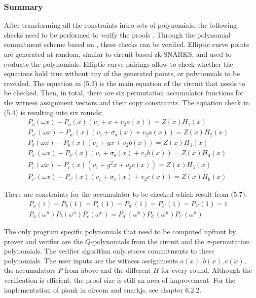 \subsubsection{Summary}
After transforming all the constraints intro sets of polynomials, the following checks need to be performed to verify the proofs \citep{PLONKcryptoeprint:2019/953, buterinplonk, chen2022review}. Through the polynomial commitment scheme based on \citep{Kate2010ConstantSizeCT}, these checks can be verified. Elliptic curve points are generated at random, similar to circuit based zk-SNARKS, and used to evaluate the polynomials. Elliptic curve pairings allow to check whether the equations hold true without any of the generated points, or polynomials to be revealed. 
The equation in (5.3) is the main equation of the circuit that needs to be checked. Then, in total, there are six permutation accumulator functions for the witness assignment vectors and their copy constraints. The equation check in (5.4) is resulting into six rounds:
\begin{align}
    P_{a}(\omega x) - P_{a}(x)(v_1 + x + v_2a(x)) = Z(x)H_{1}(x) \\
    P_{a'}(\omega x) - P_{a'}(x)(v_1 + \sigma_{a}(x) + v_2a(x)) = Z(x)H_{2}(x) \\
    P_{b}(\omega x) - P_{b}(x)(v_1 + gx + v_2b(x)) = Z(x)H_{3}(x) \\
    P_{b'}(\omega x) - P_{b'}(x)(v_1 + \sigma_{b}(x) + v_2b(x)) = Z(x)H_{4}(x) \\
    P_{c}(\omega x) - P_{c}(x)(v_1 + g^{2}x + v_2c(x)) = Z(x)H_{5}(x) \\
    P_{c'}(\omega x) - P_{c'}(x)(v_1 + \sigma_{c}(x) + v_2c(x)) = Z(x)H_{6}(x)
\end{align}

There are constraints for the accumulator to be checked which result from (5.7):
\begin{align}
    P_{a}(1) = P_{b}(1) = P_{c}(1) = P_{a'}(1) = P_{b'}(1) = P_{c'}(1) = 1 \\
    P_{a}(\omega^n)P_{b}(\omega^n)P_{c}(\omega^n) = P_{a'}(\omega^n)P_{b'}(\omega^n)P_{c'}(\omega^n)
\end{align}

The only program specific polynomials that need to be computed upfront by prover and verifier are the \(Q\)-polynomials from the circuit and the \(\sigma\)-permutation polynomials. The verifier algorithm only stores commitments to these polynomials. The user inputs are the witness assignments \(a(x), b(x), c(x)\), the accumulators \(P\) from above and the different \(H\) for every round. Although the verification is efficient, the proof size is still an area of improvement. For the implementation of plonk in circom and snarkjs, see chapter 6.2.2.

